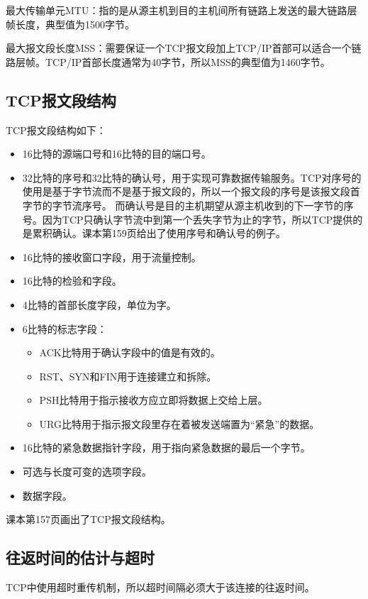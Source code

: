 \documentclass[a4paper,left=2.5cm,right=2.5cm,11pt]{article}
\begin{document}
	最大传输单元MTU：指的是从源主机到目的主机间所有链路上发送的最大链路层帧长度，典型值为1500字节。\par

	最大报文段长度MSS：需要保证一个TCP报文段加上TCP/IP首部可以适合一个链路层帧。TCP/IP首部长度通常为40字节，所以MSS的典型值为1460字节。

\subsection{TCP报文段结构}
	TCP报文段结构如下：
	\begin{itemize}
		\item 16比特的源端口号和16比特的目的端口号。
		\item 32比特的序号和32比特的确认号，用于实现可靠数据传输服务。TCP对序号的使用是基于字节流而不是基于报文段的，所以一个报文段的序号是该报文段首字节的字节流序号。
			  而确认号是目的主机期望从源主机收到的下一字节的序号。因为TCP只确认字节流中到第一个丢失字节为止的字节，所以TCP提供的是累积确认。课本第159页给出了使用序号和确认号的例子。
		\item 16比特的接收窗口字段，用于流量控制。
		\item 16比特的检验和字段。
		\item 4比特的首部长度字段，单位为字。
		\item 6比特的标志字段：
			\begin{itemize}
				\item ACK比特用于确认字段中的值是有效的。
				\item RST、SYN和FIN用于连接建立和拆除。
				\item PSH比特用于指示接收方应立即将数据上交给上层。
				\item URG比特用于指示报文段里存在着被发送端置为“紧急”的数据。
			\end{itemize}

		\item 16比特的紧急数据指针字段，用于指向紧急数据的最后一个字节。
		\item 可选与长度可变的选项字段。
		\item 数据字段。
	\end{itemize}

	课本第157页画出了TCP报文段结构。

\subsection{往返时间的估计与超时}
	TCP中使用超时重传机制，所以超时间隔必须大于该连接的往返时间。\par
\end{document}
